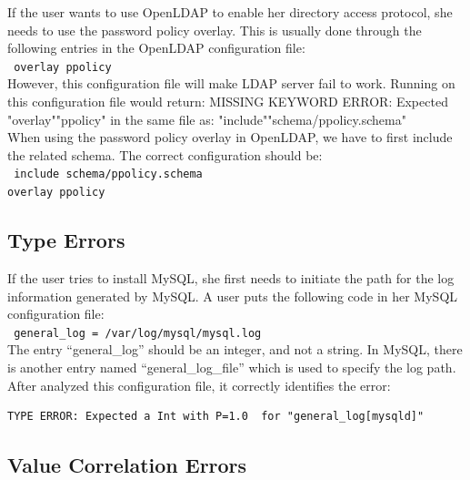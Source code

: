 If the user wants to use OpenLDAP to enable her directory access
protocol, she needs to use the password policy overlay. This is usually
done through the following entries in the OpenLDAP configuration file:\\
\texttt{
 \hspace*{3em}overlay ppolicy\\}
However, this configuration file will make LDAP server fail to work.
Running \app on this configuration file would return:
MISSING KEYWORD ERROR: Expected "overlay""ppolicy" in the same file as: "include""schema/ppolicy.schema"\\
When using the password policy overlay in OpenLDAP, we have to first include the related schema. The correct configuration should be:\\
\texttt{
 \hspace*{3em}include schema/ppolicy.schema\\
 \hspace*{3em}overlay ppolicy\\
}

\subsection{Type Errors}

If the user tries to install MySQL, she first needs to 
initiate the path for the
log information generated by MySQL. A user puts the following code in 
her MySQL configuration file:\\
\texttt{
 \hspace*{3em}general\_log = /var/log/mysql/mysql.log\\}
The entry ``general\_log'' should be an integer, 
and not a string. In MySQL, there is another entry named
``general\_log\_file'' which is used to specify the log path.  
After \app analyzed this configuration file, it correctly identifies the error:
\begin{verbatim}
TYPE ERROR: Expected a Int with P=1.0  for "general_log[mysqld]"
\end{verbatim}

\subsection{Value Correlation Errors}

